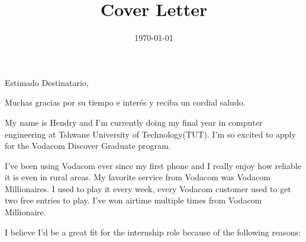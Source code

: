 \documentclass[11pt,a4paper,roman]{moderncv}        %
\title{Cover Letter}                               %
\date{\today}
\begin{document}
\opening{Estimado Destinatario,}
\closing{Muchas gracias por su tiempo e interés y reciba un cordial saludo.}
\makelettertitle

My name is Hendry and I'm currently doing my final year in computer engineering at Tshwane University of Technology(TUT). I'm so excited to apply for the Vodacom Discover Graduate program.

I've been using Vodacom ever since my first phone and I really enjoy how reliable it is even in rural areas. My favorite service from Vodacom was Vodacom Millionaires. I used to play it every week,  every Vodacom customer used to get two free entries to play.  I've won airtime multiple times from Vodacom Millionaire.

I believe I'd be a great fit for the internship role because of the following reasons:
\end{document}
